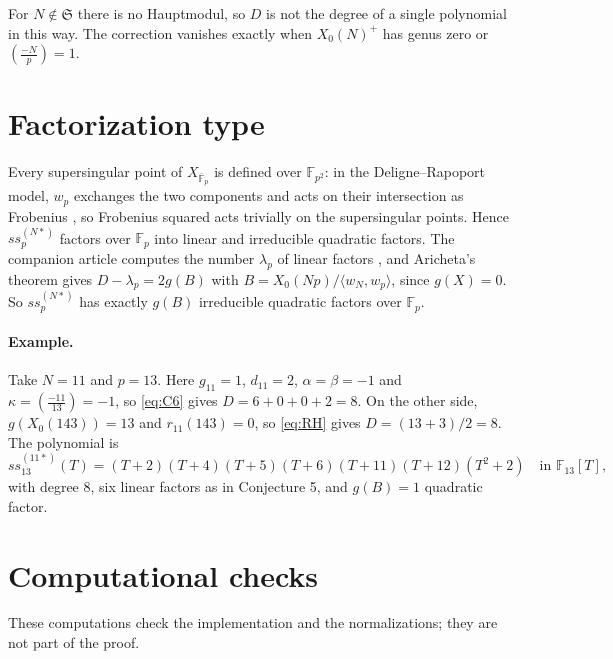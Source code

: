\documentclass[11pt,a4paper]{article}
\theoremstyle{remark}\newtheorem{remark}[theorem]{Remark}
\numberwithin{equation}{section}
\newcommand{\Fp}{\mathbb F_p}
\newcommand{\kk}{\overline{\mathbb F}_p}
\newcommand{\leg}[2]{\left(\frac{#1}{#2}\right)}
\begin{document}
For $N\notin\mathfrak S$ there is no Hauptmodul, so $D$ is not the degree of a single polynomial in this way. The correction vanishes exactly when $X_0(N)^+$ has genus zero or $\leg{-N}{p}=1$.

\section{Factorization type}
Every supersingular point of $X_{\kk}$ is defined over $\mathbb F_{p^2}$: in the Deligne--Rapoport model, $w_p$ exchanges the two components and acts on their intersection as Frobenius \cite[Proposition 3.8(i)]{Ribet}, so Frobenius squared acts trivially on the supersingular points. Hence $ss_p^{(N*)}$ factors over $\Fp$ into linear and irreducible quadratic factors. The companion article computes the number $\lambda_p$ of linear factors \cite[Corollary 1.2]{Companion}, and Aricheta's theorem \cite[Theorem 3.1]{Aricheta} gives $D-\lambda_p=2g(B)$ with $B=X_0(Np)/\langle w_N,w_p\rangle$, since $g(X)=0$. So $ss_p^{(N*)}$ has exactly $g(B)$ irreducible quadratic factors over $\Fp$.

\paragraph{Example.} Take $N=11$ and $p=13$. Here $g_{11}=1$, $d_{11}=2$, $\alpha=\beta=-1$ and $\kappa=\leg{-11}{13}=-1$, so \eqref{eq:C6} gives $D=6+0+0+2=8$. On the other side, $g(X_0(143))=13$ and $r_{11}(143)=0$, so \eqref{eq:RH} gives $D=(13+3)/2=8$. The polynomial is
\[
ss_{13}^{(11*)}(T)=(T+2)(T+4)(T+5)(T+6)(T+11)(T+12)(T^2+2)\quad\text{in }\mathbb F_{13}[T],
\]
with degree $8$, six linear factors as in Conjecture 5, and $g(B)=1$ quadratic factor.

\section{Computational checks}
These computations check the implementation and the normalizations; they are not part of the proof.
\end{document}
